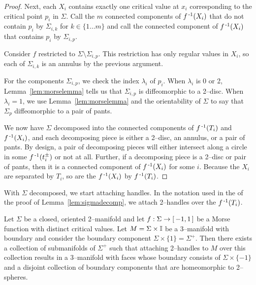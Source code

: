 \begin{proof}
	Next, each $X_i$ contains exactly one critical value at $x_i$ corresponding to the critical point $p_i$ in $\Sigma$.
	Call the $m$ connected components of $f^{\,\text{-}1}(X_i)$ that do not contain $p_i$ by $\Sigma_{i,k}$ for $k\in\{1\dots m\}$ and call the connected component of $f^{\,\text{-}1}(X_i)$ that contains $p_i$ by $\Sigma_{i,p}$.
	
	Consider $f$ restricted to $\Sigma\setminus\Sigma_{i,p}$.
	This restriction has only regular values in $X_i$, so each of $\Sigma_{i,k}$ is an annulus by the previous argument.
	
	For the components $\Sigma_{i,p}$, we check the index $\lambda_i$ of $p_i$.
	When $\lambda_i$ is 0 or 2, Lemma~\ref{lem:morselemma} tells us that $\Sigma_{i,p}$ is diffeomorphic to a 2--disc.
	When $\lambda_i=1$, we use Lemma~\ref{lem:morselemma} and the orientability of $\Sigma$ to say that $\Sigma_p$ diffeomorphic to a pair of pants.
	
	
	We now have $\Sigma$ decomposed into the connected components of $f^{\,\text{-}1}(T_i)$ and $f^{\,\text{-}1}(X_i)$, and each decomposing piece is either a 2--disc, an annulus, or a pair of pants.
	By design, a pair of decomposing pieces will either intersect along a circle in some $f^{\,\text{-}1}(t_i^\pm)$ or not at all.
	Further, if a decomposing piece is a 2--disc or pair of pants, then it is a connected component of $f^{\,\text{-}1}(X_i)$ for some $i$.
	Because the $X_i$ are separated by $T_i$, so are the $f^{\,\text{-}1}(X_i)$ by $f^{\,\text{-}1}(T_i)$.	
\end{proof}

With $\Sigma$ decomposed, we start attaching handles.
In the notation used in the of the proof of Lemma~\ref{lem:sigmadecomp}, we attach 2--handles over the $f^{\,\text{-}1}(T_i)$.

\begin{lem}
	\label{lem:sigma2handles}
	Let $\Sigma$ be a closed, oriented 2--manifold and let $f:\Sigma\to[\,-1,1\,]$ be a Morse function with distinct critical values.
	Let $M=\Sigma\times\mathbb{I}$ be a 3--manifold with boundary and consider the boundary component $\Sigma\times\{1\}=\Sigma^+$.
	Then there exists a collection of submanifolds of $\Sigma^+$ such that attaching 2--handles to $M$ over this collection results in a 3--manifold with faces whose boundary consists of $\Sigma\times\{-1\}$ and a disjoint collection of boundary components that are homeomorphic to 2--spheres.
\end{lem}

